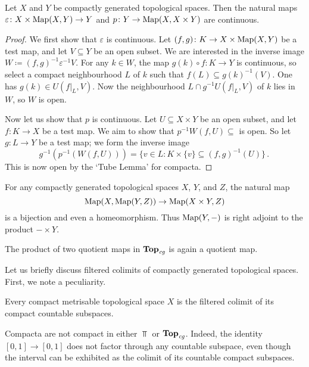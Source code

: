 \begin{lem}
	Let $ X $ and $ Y $ be compactly generated topological spaces.
	Then the natural maps $ \varepsilon \colon X \times \operatorname{Map}( X, Y ) \to Y $ and $ p \colon Y \to \operatorname{Map}( X, X \times Y ) $ are continuous.
\end{lem}

\begin{proof}
	We first show that $\varepsilon$ is continuous.
	Let $ ( f, g ) \colon K \to X \times \operatorname{Map}( X, Y ) $ be a test map, and let $ V \subseteq Y $ be an open subset.
	We are interested in the inverse image $ W \coloneq ( f, g )^{-1}\varepsilon^{-1} V $.
	For any $ k \in W $, the map $ g(k) \circ f \colon K \to Y $ is continuous, so select a compact neighbourhood $ L $ of $ k $ such that $ f(L) \subseteq g(k)^{-1}(V) $.
	One has $ g(k) \in U(f|_L, V) $.
	Now the neighbourhood $ L \cap g^{-1}U(f|_L, V) $ of $ k $ lies in $ W $, so $ W $ is open.

	Now let us show that $ p $ is continuous.
	Let $ U \subseteq X \times Y $ be an open subset, and let $ f \colon K \to X $ be a test map.
	We aim to show that $ p^{-1} W(f, U) \subseteq $ is open.
	So let $ g \colon L \to Y $ be a test map;
	we form the inverse image
	\[
		g^{-1}(p^{-1}(W(f, U))) = \{ v \in L : K \times \{v\} \subseteq (f, g)^{-1}(U) \} \period
	\]
	This is now open by the `Tube Lemma' for compacta.
\end{proof}

\begin{cor}
	For any compactly generated topological spaces $ X $, $ Y $, and $ Z $, the natural map
	\[
		\operatorname{Map}( X, \operatorname{Map}(Y, Z) ) \to \operatorname{Map}( X \times Y, Z )
	\]
	is a bijection and even a homeomorphism.
	Thus $ \operatorname{Map}(Y, -) $ is right adjoint to the product $ - \times Y $.
\end{cor}

\begin{cor}
	The product of two quotient maps in $ \textbf{\textup{Top}}_{\textit{cg}} $ is again a quotient map.
\end{cor}

Let us briefly discuss filtered colimits of compactly generated topological spaces.
First, we note a peculiarity.

\begin{wrn}
	Every compact metrisable topological space $ X $ is the filtered colimit of its compact countable subspaces.

	Compacta are not compact in either $ \Top $ or $ \textbf{\textup{Top}}_{\textit{cg}} $.
	Indeed, the identity $ [0, 1] \to [0, 1] $ does not factor through any countable subspace, even though the interval can be exhibited as the colimit of its countable compact subspaces.
\end{wrn}

